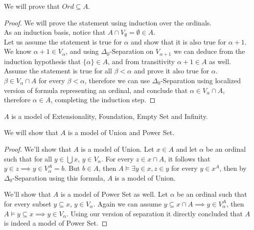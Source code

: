 \subquestion{}
We will prove that $Ord \subseteq A$.
\begin{proof}
	We will prove the statement using induction over the ordinals. \\
	As an induction basis, notice that $A \cap V_\emptyset = \emptyset \in A$. \\
	Let us assume the statement is true for $\alpha$ and show that it is also true for $\alpha + 1$.
	We know $\alpha + 1 \in V_{\alpha}$, and using $\Delta_0$-Separation on $V_{\alpha + 1}$ we can deduce from the induction hypothesis that $\{\alpha\} \in A$, and from transitivity $\alpha + 1 \in A$ as well. \\
	Assume the statement is true for all $\beta < \alpha$ and prove it also true for $\alpha$.
	$\beta \in V_\alpha \cap A$ for every $\beta < \alpha$, therefore we can use $\Delta_0$-Separation using localized version of formula representing an ordinal,
	and conclude that $\alpha \in V_\alpha \cap A$, therefore $\alpha \in A$, completing the induction step.
\end{proof}
\begin{remark}
	$A$ is a model of Extensionality, Foundation, Empty Set and Infinity.
\end{remark}

\subquestion{}
We will show that $A$ is a model of Union and Power Set.
\begin{proof}
	We'll show that $A$ is a model of Union.
	Let $x \in A$ and let $\alpha$ be an ordinal such that for all $y \in \bigcup x$, $y \in V_\alpha$.
	For every $z \in x \cap A$, it follows that $y \in z \implies y \in V_\alpha^A = b$.
	But $b \in A$, then $A \models \exists y \in x, z \in y$ for every $y \in x^A$, then by $\Delta_0$-Separation using this formula, $A$ is a model of Union.

	We'll show that $A$ is a model of Power Set as well.
	Let $\alpha$ be an ordinal such that for every subset $y \subseteq x$, $y \in V_\alpha$.
	Again we can assume $y \subseteq x \cap A \implies y \in V_\alpha^A$, then $A \models y \subseteq x \implies y \in V_\alpha$.
	Using our version of separation it directly concluded that $A$ is indeed a model of Power Set.
\end{proof}

